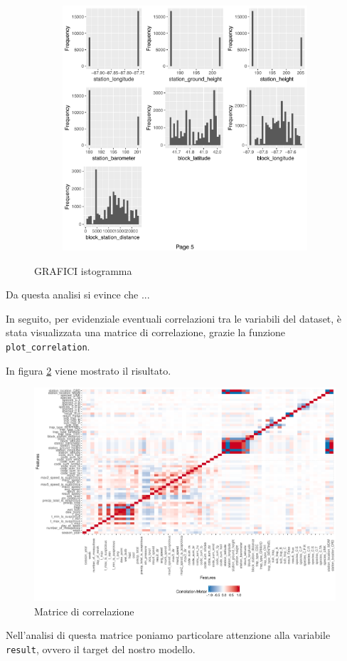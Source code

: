 \begin{figure}[H]
	\ContinuedFloat 
	\begin{subfigure}[t]{0.49\textwidth}
		\includegraphics[width=\textwidth]{images/ml/plot_histogram5}
	\end{subfigure}
\caption{GRAFICI istogramma}
\label{fig:plot_histogram}
\end{figure}

Da questa analisi si evince che ...


In seguito, per evidenziale eventuali correlazioni tra le variabili del 
dataset, è stata visualizzata una matrice di correlazione, grazie la funzione 
\texttt{plot\_correlation}.

In figura \ref{fig:plot_correlation} viene mostrato il risultato.

\begin{figure}[htb]
	\centering
	\includegraphics[width=1\columnwidth]{images/ml/plot_correlation}
	\caption{Matrice di correlazione}
	\label{fig:plot_correlation}
\end{figure}

Nell'analisi di questa matrice poniamo particolare attenzione alla variabile 
\texttt{result}, ovvero il target del nostro modello.
